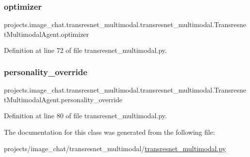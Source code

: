 \subsubsection{\texorpdfstring{optimizer}{optimizer}}
{\footnotesize\ttfamily projects.\+image\+\_\+chat.\+transresnet\+\_\+multimodal.\+transresnet\+\_\+multimodal.\+Transresnet\+Multimodal\+Agent.\+optimizer}



Definition at line 72 of file transresnet\+\_\+multimodal.\+py.

\mbox{\label{classprojects_1_1image__chat_1_1transresnet__multimodal_1_1transresnet__multimodal_1_1TransresnetMultimodalAgent_acd2f07e8994da4f38ced44267a8961dc}} 
\subsubsection{\texorpdfstring{personality\+\_\+override}{personality\_override}}
{\footnotesize\ttfamily projects.\+image\+\_\+chat.\+transresnet\+\_\+multimodal.\+transresnet\+\_\+multimodal.\+Transresnet\+Multimodal\+Agent.\+personality\+\_\+override}



Definition at line 80 of file transresnet\+\_\+multimodal.\+py.



The documentation for this class was generated from the following file\+:\begin{DoxyCompactItemize}
\item 
projects/image\+\_\+chat/transresnet\+\_\+multimodal/\hyperlink{projects_2image__chat_2transresnet__multimodal_2transresnet__multimodal_8py}{transresnet\+\_\+multimodal.\+py}\end{DoxyCompactItemize}
